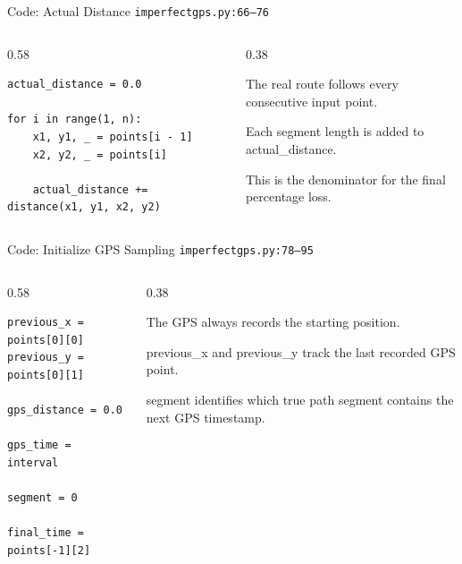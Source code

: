 \documentclass[aspectratio=169,11pt]{beamer}
\begin{document}
\begin{frame}[fragile]{Code: Actual Distance}
\scriptsize
{} \texttt{imperfectgps.py:66--76}

\vspace{0.08cm}
\begin{columns}[T,totalwidth=\textwidth]
\begin{column}{0.58\textwidth}
\begin{lstlisting}[style=cpcode]
actual_distance = 0.0

for i in range(1, n):
    x1, y1, _ = points[i - 1]
    x2, y2, _ = points[i]

    actual_distance += distance(x1, y1, x2, y2)
\end{lstlisting}
\end{column}
\begin{column}{0.38\textwidth}
\begin{tightitemize}
  \item The real route follows every consecutive input point.
  \item Each segment length is added to actual\_distance.
  \item This is the denominator for the final percentage loss.
\end{tightitemize}
\end{column}
\end{columns}
\end{frame}

\begin{frame}[fragile]{Code: Initialize GPS Sampling}
\scriptsize
{} \texttt{imperfectgps.py:78--95}

\vspace{0.08cm}
\begin{columns}[T,totalwidth=\textwidth]
\begin{column}{0.58\textwidth}
\begin{lstlisting}[style=cpcode]
previous_x = points[0][0]
previous_y = points[0][1]

gps_distance = 0.0

gps_time = interval

segment = 0

final_time = points[-1][2]
\end{lstlisting}
\end{column}
\begin{column}{0.38\textwidth}
\begin{tightitemize}
  \item The GPS always records the starting position.
  \item previous\_x and previous\_y track the last recorded GPS point.
  \item segment identifies which true path segment contains the next GPS timestamp.
\end{tightitemize}
\end{column}
\end{columns}
\end{frame}
\end{document}
